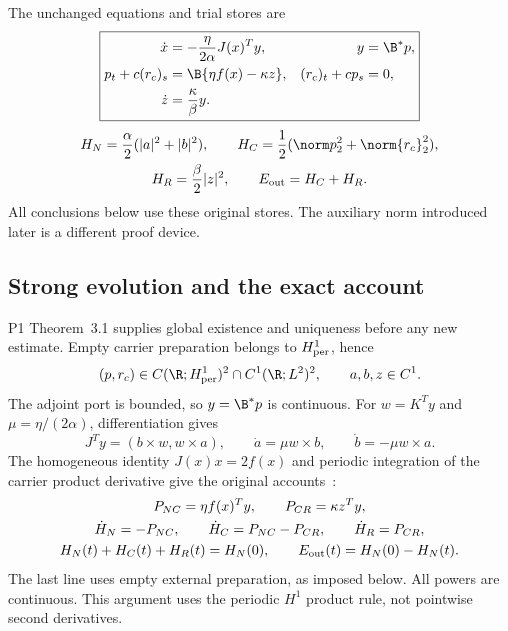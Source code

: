 The unchanged equations and trial stores are~\cite[Section 1]{p1}
\begin{equation}\label{eq:system}%
\boxed{\begin{aligned}
 \dot x&=-\frac{\eta}{2\alpha}J(x)^Ty,&y&=\B^*p,\\
 p_t+c(r_c)_s&=\B\{\eta f(x)-\kappa z\},&
 (r_c)_t+cp_s&=0,\\
 \dot z&=\frac{\kappa}{\beta}y .
\end{aligned}}
\end{equation}
\begin{equation}\label{eq:stores}%
\begin{gathered}
 H_N=\frac{\alpha}{2}(|a|^2+|b|^2),\qquad
 H_C=\frac12(\norm p_2^2+\norm{r_c}_2^2),\\
 H_R=\frac{\beta}{2}|z|^2,\qquad E_{\rm out}=H_C+H_R .
\end{gathered}
\end{equation}
All conclusions below use these original stores. The auxiliary norm introduced later is a different proof device.

\subsection{Strong evolution and the exact account}\label{sec:inherited}
P1 Theorem~3.1 supplies global existence and uniqueness before any new estimate. Empty carrier preparation belongs to $H^1_{\rm per}$, hence
\begin{equation}\label{eq:regularity}
 (p,r_c)\in C(\R;H^1_{\rm per})^2\cap C^1(\R;L^2)^2,
 \qquad a,b,z\in C^1 .
\end{equation}
The adjoint port is bounded, so $y=\B^*p$ is continuous. For $w=K^Ty$ and $\mu=\eta/(2\alpha)$, differentiation gives
\begin{equation}\label{eq:nativesigns}
 J^Ty=(b\times w,w\times a),\qquad
 \dot a=\mu w\times b,\qquad \dot b=-\mu w\times a .
\end{equation}
The homogeneous identity $J(x)x=2f(x)$ and periodic integration of the carrier product derivative give the original accounts~\cite[Proposition 2.1]{p1}:
\begin{equation}\label{eq:accounts}%
\begin{gathered}
 P_{NC}=\eta f(x)^Ty,\qquad P_{CR}=\kappa z^Ty,\\
 \dot H_N=-P_{NC},\qquad \dot H_C=P_{NC}-P_{CR},\qquad
 \dot H_R=P_{CR},\\
 H_N(t)+H_C(t)+H_R(t)=H_N(0),\qquad
 E_{\rm out}(t)=H_N(0)-H_N(t).
\end{gathered}
\end{equation}
The last line uses empty external preparation, as imposed below. All powers are continuous. This argument uses the periodic $H^1$ product rule, not pointwise second derivatives.
